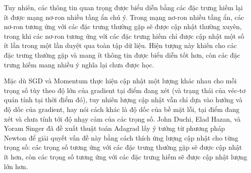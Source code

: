 Tuy nhiên, các thông tin quan trọng được biểu diễn bằng các đặc trưng hiếm lại ít được mạng nơ-ron nhiều tầng ẩn chú ý. Trong mạng nơ-ron nhiều tầng ẩn, các nơ-ron tương ứng với các đặc trưng thường gặp sẽ được cập nhật thường xuyên, trong khi các nơ-ron tương ứng với các đặc trưng hiếm chỉ được cập nhật một số ít lần trong một lần duyệt qua toàn tập dữ liệu. Hiện tượng này khiến cho các đặc trưng thường gặp và mang ít thông tin được biểu diễn tốt hơn, còn các đặc trưng hiếm mang nhiều ý nghĩa lại chưa được học.

Mặc dù SGD và Momentum thực hiện cập nhật một lượng khác nhau cho mỗi trọng số tùy theo độ lớn của gradient tại điểm đang xét (và trạng thái của véc-tơ quán tính tại thời điểm đó), tuy nhiên lượng cập nhật vẫn chỉ dựa vào hướng và độ dốc của gradient, hay nói cách khác là độ dốc của bề mặt lỗi, tại điểm đang xét và chưa tính tới độ nhạy cảm của các trọng số. John Duchi, Elad Hazan, và Yoram Singer đã đề xuất thuật toán Adagrad \cite{duchi2011adaptive} lấy ý tưởng từ phương pháp Newton để giải quyết vấn đề này bằng cách thích ứng lượng cập nhật cho từng trọng số: các trọng số tương ứng với các đặc trưng thường gặp sẽ được cập nhật ít hơn, còn các trọng số tương ứng với các đặc trưng hiếm sẽ được cập nhật lượng lớn hơn.

